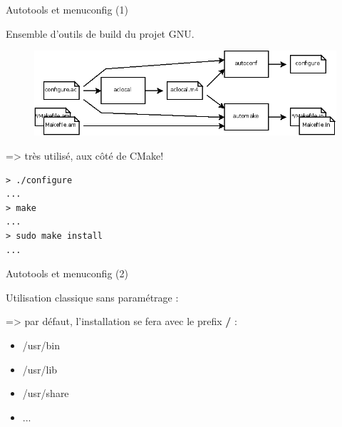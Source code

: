 \documentclass[12pt, t]{beamer}
\newcommand{\bi}{\begin{itemize}}
\newcommand{\ei}{\end{itemize}}
\begin{document}
\begin{frame}{Autotools et menuconfig (1)}

    \vspace{15pt}
    Ensemble d'outils de build du projet GNU.

    \begin{figure}
        \centering
        \includegraphics[scale=0.45]{autotools.png}
    \end{figure}

    {
        \vspace{15pt}
        => très utilisé, aux côté de CMake!
    }
\end{frame}

{
    \begin{lstlisting}
> ./configure
...
> make
...
> sudo make install
...
    \end{lstlisting}
}

\begin{frame}{Autotools et menuconfig (2)}

    \vspace{10pt}
    Utilisation classique sans paramétrage :
    \vspace{5pt}
    \lstauto

    {
        \vspace{10pt}
        => par défaut, l'installation se fera avec le prefix {\textbf{/}} :
        \bi
        \itemsep8pt
        \item /usr/bin
        \item /usr/lib
        \item /usr/share
        \item ...
        \ei
    }
\end{frame}
\end{document}
